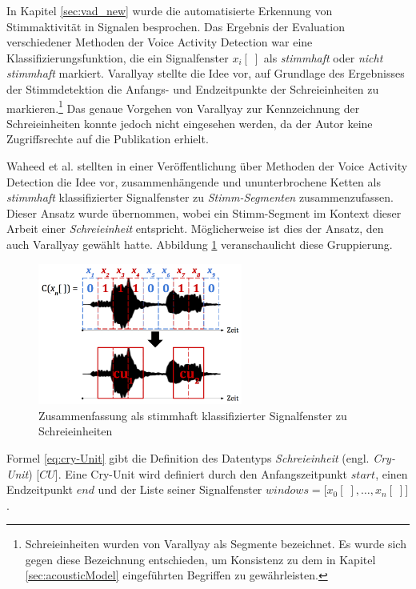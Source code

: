 In Kapitel \ref{sec:vad_new} wurde die automatisierte Erkennung von Stimmaktivität in Signalen besprochen. Das Ergebnis der Evaluation verschiedener Methoden der Voice Activity Detection war eine Klassifizierungsfunktion, die ein Signalfenster $x_i[\;]$ als \emph{stimmhaft} oder \emph{nicht stimmhaft} markiert. Varallyay \cite[S. 16 - 17]{cry_thesis} stellte die Idee vor, auf Grundlage des Ergebnisses der Stimmdetektion die Anfangs- und Endzeitpunkte der Schreieinheiten zu markieren.\footnote{\glqq Schreieinheiten\grqq{} wurden von Varallyay als \glqq Segmente\grqq{} bezeichnet. Es wurde sich gegen diese Bezeichnung entschieden, um Konsistenz zu dem in Kapitel \ref{sec:acousticModel} eingeführten Begriffen zu gewährleisten.} Das genaue Vorgehen von Varallyay zur Kennzeichnung der Schreieinheiten konnte jedoch nicht eingesehen werden, da der Autor keine Zugriffsrechte auf die Publikation erhielt.

Waheed et al. \cite{vad_entropy} stellten in einer Veröffentlichung über Methoden der Voice Activity Detection die Idee vor, zusammenhängende und ununterbrochene Ketten als \emph{stimmhaft} klassifizierter Signalfenster zu \emph{Stimm-Segmenten} zusammenzufassen. Dieser Ansatz wurde übernommen, wobei ein Stimm-Segment im Kontext dieser Arbeit einer \emph{Schreieinheit} entspricht. Möglicherweise ist dies der Ansatz, den auch  Varallyay \cite[S. 16 - 17]{cry_thesis} gewählt hatte. Abbildung \ref{img:cryUnit} veranschaulicht diese Gruppierung. 

\begin{figure}[h]
	\centering
	\includegraphics[width=0.6\textwidth]{bilder/cry-Unit02.png}
	\caption{Zusammenfassung als stimmhaft klassifizierter Signalfenster zu Schreieinheiten}
	\label{img:cryUnit}
\end{figure}

Formel \ref{eq:cry-Unit} gibt die Definition des Datentyps \emph{Schreieinheit} (engl. \emph{Cry-Unit}) [$CU$]. Eine Cry-Unit wird definiert durch den Anfangszeitpunkt $start$, einen Endzeitpunkt $end$ und der Liste seiner Signalfenster $windows = \big[x_0[\;], \ldots, x_n[\;]\big]$.

